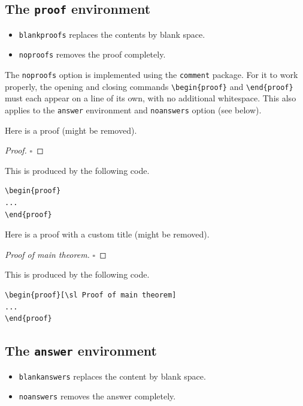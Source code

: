 \documentclass{article}
\theoremstyle{break}
\providecommand{\qed}{\par\mbox{}\hfill$\square$}
\begin{document}
\subsection{The {\tt proof} environment}
\begin{itemize}
\item {\tt blankproofs} replaces the contents by blank space. 
\item {\tt noproofs} removes the proof completely.
\end{itemize}

The {\tt noproofs} option is implemented using the {\tt comment} package. For it to work properly, the opening and closing commands \verb+\begin{proof}+ and \verb+\end{proof}+ must each appear on a line of its own, with no additional whitespace. This also applies to the \verb+answer+ environment and {\tt noanswers} option (see below).

Here is a proof (might be removed).
\begin{proof}
\lipsum[13]
\qed
\end{proof}

This is produced by the following code.
\begin{Verbatim}[frame=single]
\begin{proof}
...
\end{proof}
\end{Verbatim}

Here is a proof with a custom title (might be removed).
\begin{proof}[\sl Proof of main theorem]
\lipsum[13]
\qed
\end{proof}

This is produced by the following code.
\begin{Verbatim}[frame=single]
\begin{proof}[\sl Proof of main theorem]
...
\end{proof}
\end{Verbatim}

\subsection{The {\tt answer} environment}

\begin{itemize}
\item {\tt blankanswers} replaces the content by blank space. 
\item {\tt noanswers} removes the answer completely.
\end{itemize}
\end{document}

